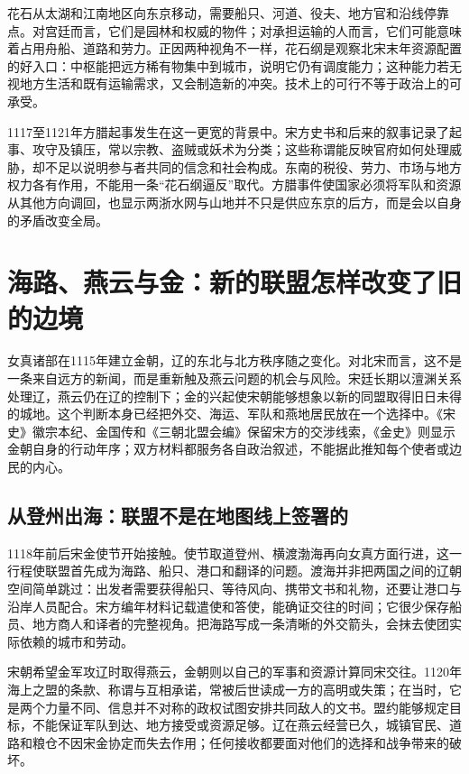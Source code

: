 花石从太湖和江南地区向东京移动，需要船只、河道、役夫、地方官和沿线停靠点。对宫廷而言，它们是园林和权威的物件；对承担运输的人而言，它们可能意味着占用舟船、道路和劳力。正因两种视角不一样，花石纲是观察北宋末年资源配置的好入口：中枢能把远方稀有物集中到城市，说明它仍有调度能力；这种能力若无视地方生活和既有运输需求，又会制造新的冲突。技术上的可行不等于政治上的可承受。

1117至1121年方腊起事发生在这一更宽的背景中。宋方史书和后来的叙事记录了起事、攻守及镇压，常以宗教、盗贼或妖术为分类；这些称谓能反映官府如何处理威胁，却不足以说明参与者共同的信念和社会构成。东南的税役、劳力、市场与地方权力各有作用，不能用一条“花石纲逼反”取代。方腊事件使国家必须将军队和资源从其他方向调回，也显示两浙水网与山地并不只是供应东京的后方，而是会以自身的矛盾改变全局。

\section{海路、燕云与金：新的联盟怎样改变了旧的边境}

女真诸部在1115年建立金朝，辽的东北与北方秩序随之变化。对北宋而言，这不是一条来自远方的新闻，而是重新触及燕云问题的机会与风险。宋廷长期以澶渊关系处理辽，燕云仍在辽的控制下；金的兴起使宋朝能够想象以新的同盟取得旧日未得的城地。这个判断本身已经把外交、海运、军队和燕地居民放在一个选择中。《宋史》徽宗本纪、金国传和《三朝北盟会编》保留宋方的交涉线索，《金史》则显示金朝自身的行动年序；双方材料都服务各自政治叙述，不能据此推知每个使者或边民的内心。

\subsection{从登州出海：联盟不是在地图线上签署的}

1118年前后宋金使节开始接触。使节取道登州、横渡渤海再向女真方面行进，这一行程使联盟首先成为海路、船只、港口和翻译的问题。渡海并非把两国之间的辽朝空间简单跳过：出发者需要获得船只、等待风向、携带文书和礼物，还要让港口与沿岸人员配合。宋方编年材料记载遣使和答使，能确证交往的时间；它很少保存船员、地方商人和译者的完整视角。把海路写成一条清晰的外交箭头，会抹去使团实际依赖的城市和劳动。

宋朝希望金军攻辽时取得燕云，金朝则以自己的军事和资源计算同宋交往。1120年海上之盟的条款、称谓与互相承诺，常被后世读成一方的高明或失策；在当时，它是两个力量不同、信息并不对称的政权试图安排共同敌人的文书。盟约能够规定目标，不能保证军队到达、地方接受或资源足够。辽在燕云经营已久，城镇官民、道路和粮仓不因宋金协定而失去作用；任何接收都要面对他们的选择和战争带来的破坏。

